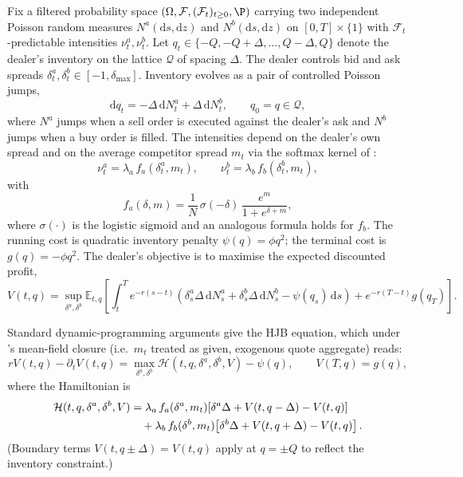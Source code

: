 \documentclass[11pt,a4paper]{article}
\theoremstyle{definition}
\theoremstyle{remark}
\newcommand{\E}{\mathbb{E}}
\newcommand{\dd}{\mathrm{d}}
\begin{document}
Fix a filtered probability space $(\Omega, \mathcal{F}, (\mathcal{F}_t)_{t \geq 0}, \P)$
carrying two independent Poisson random measures $N^a(\dd s, \dd z)$
and $N^b(\dd s, \dd z)$ on $[0, T] \times \{1\}$ with
$\mathcal{F}_t$-predictable intensities $\nu^a_t, \nu^b_t$.  Let
$q_t \in \{-Q, -Q + \Delta, \ldots, Q - \Delta, Q\}$ denote the
dealer's inventory on the lattice $\mathcal{Q}$ of spacing $\Delta$.
The dealer controls bid and ask spreads
$\delta^a_t, \delta^b_t \in [-1, \delta_{\max}]$.  Inventory evolves
as a pair of controlled Poisson jumps,
\begin{equation}\label{eq:inventory-sde}
\dd q_t = -\Delta \, \dd N^a_t + \Delta \, \dd N^b_t,
\qquad q_0 = q \in \mathcal{Q},
\end{equation}
where $N^a$ jumps when a sell order is executed against the dealer's
ask and $N^b$ jumps when a buy order is filled.  The intensities
depend on the dealer's own spread and on the average competitor
spread $m_t$ via the softmax kernel of \citet[eq.~58]{cont2024}:
\begin{equation}\label{eq:intensities}
\nu^a_t = \lambda_a \, f_a(\delta^a_t, m_t),
\qquad
\nu^b_t = \lambda_b \, f_b(\delta^b_t, m_t),
\end{equation}
with
\begin{equation}\label{eq:softmax}
f_a(\delta, m) = \frac{1}{N} \, \sigma(-\delta) \, \frac{e^{m}}{1 + e^{\delta + m}},
\end{equation}
where $\sigma(\cdot)$ is the logistic sigmoid and an analogous
formula holds for $f_b$.  The running cost is quadratic inventory
penalty $\psi(q) = \phi q^2$; the terminal cost is
$g(q) = -\phi q^2$.  The dealer's objective is to maximise the
expected discounted profit,
\begin{equation}\label{eq:objective}
V(t, q) = \sup_{\delta^a, \delta^b} \E_{t, q} \!\left[
\int_t^T e^{-r (s-t)} \!\left(
\delta^a_s \Delta \, \dd N^a_s + \delta^b_s \Delta \, \dd N^b_s - \psi(q_s) \, \dd s
\right) + e^{-r(T-t)} g(q_T) \right].
\end{equation}

Standard dynamic-programming arguments \citep{carmona2018} give the
HJB equation, which under \citet{cont2024}'s mean-field closure
(i.e.\ $m_t$ treated as given, exogenous quote aggregate) reads:
\begin{equation}\label{eq:hjb}
r V(t, q) - \partial_t V(t, q)
= \max_{\delta^a, \delta^b} \mathcal{H}(t, q, \delta^a, \delta^b, V)
- \psi(q),
\qquad V(T, q) = g(q),
\end{equation}
where the Hamiltonian is
\begin{align}\label{eq:hamiltonian}
\mathcal{H}(t, q, \delta^a, \delta^b, V)
&= \lambda_a \, f_a(\delta^a, m_t) \!\left[ \delta^a \Delta + V(t, q - \Delta) - V(t, q) \right] \notag\\
&\quad + \lambda_b \, f_b(\delta^b, m_t) \!\left[ \delta^b \Delta + V(t, q + \Delta) - V(t, q) \right].
\end{align}
(Boundary terms $V(t, q \pm \Delta) = V(t, q)$ apply at $q = \pm Q$
to reflect the inventory constraint.)
\end{document}

